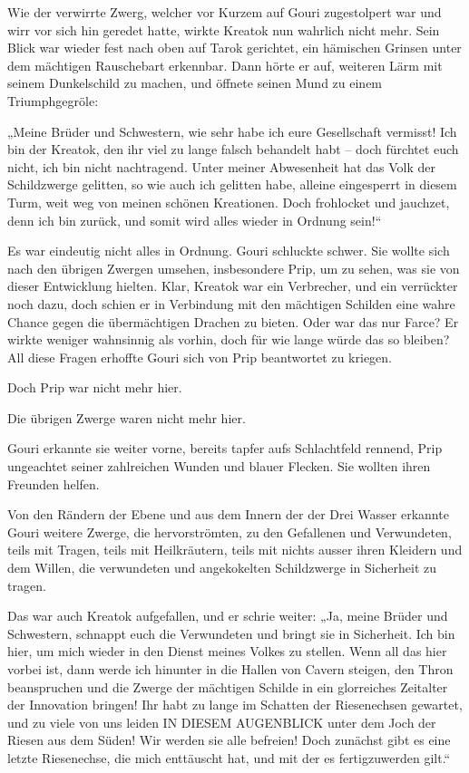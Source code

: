 Wie der verwirrte Zwerg, welcher vor Kurzem auf Gouri zugestolpert war und wirr vor sich hin geredet hatte, wirkte Kreatok nun wahrlich nicht mehr. Sein Blick war wieder fest nach oben auf Tarok gerichtet, ein hämischen Grinsen unter dem mächtigen Rauschebart erkennbar. Dann hörte er auf, weiteren Lärm mit seinem Dunkelschild zu machen, und öffnete seinen Mund zu einem Triumphgegröle:

„Meine Brüder und Schwestern, wie sehr habe ich eure Gesellschaft vermisst! Ich bin der Kreatok, den ihr viel zu lange falsch behandelt habt – doch fürchtet euch nicht, ich bin nicht nachtragend. Unter meiner Abwesenheit hat das Volk der Schildzwerge gelitten, so wie auch ich gelitten habe, alleine eingesperrt in diesem Turm, weit weg von meinen schönen Kreationen. Doch frohlocket und jauchzet, denn ich bin zurück, und somit wird alles wieder in Ordnung sein!“

Es war eindeutig nicht alles in Ordnung. Gouri schluckte schwer. Sie wollte sich nach den übrigen Zwergen umsehen, insbesondere Prip, um zu sehen, was sie von dieser Entwicklung hielten. Klar, Kreatok war ein Verbrecher, und ein verrückter noch dazu, doch schien er in Verbindung mit den mächtigen Schilden eine wahre Chance gegen die übermächtigen Drachen zu bieten. Oder war das nur Farce? Er wirkte weniger wahnsinnig als vorhin, doch für wie lange würde das so bleiben? All diese Fragen erhoffte Gouri sich von Prip beantwortet zu kriegen.

Doch Prip war nicht mehr hier.

Die übrigen Zwerge waren nicht mehr hier.

Gouri erkannte sie weiter vorne, bereits tapfer aufs Schlachtfeld rennend, Prip ungeachtet seiner zahlreichen Wunden und blauer Flecken. Sie wollten ihren Freunden helfen.

Von den Rändern der Ebene und aus dem Innern der der Drei Wasser erkannte Gouri weitere Zwerge, die hervorströmten, zu den Gefallenen und Verwundeten, teils mit Tragen, teils mit Heilkräutern, teils mit nichts ausser ihren Kleidern und dem Willen, die verwundeten und angekokelten Schildzwerge in Sicherheit zu tragen.

Das war auch Kreatok aufgefallen, und er schrie weiter: „Ja, meine Brüder und Schwestern, schnappt euch die Verwundeten und bringt sie in Sicherheit. Ich bin hier, um mich wieder in den Dienst meines Volkes zu stellen. Wenn all das hier vorbei ist, dann werde ich hinunter in die Hallen von Cavern steigen, den Thron beanspruchen und die Zwerge der mächtigen Schilde in ein glorreiches Zeitalter der Innovation bringen! Ihr habt zu lange im Schatten der Riesenechsen gewartet, und zu viele von uns leiden IN DIESEM AUGENBLICK unter dem Joch der Riesen aus dem Süden! Wir werden sie alle befreien! Doch zunächst gibt es eine letzte Riesenechse, die mich enttäuscht hat, und mit der es fertigzuwerden gilt.“

